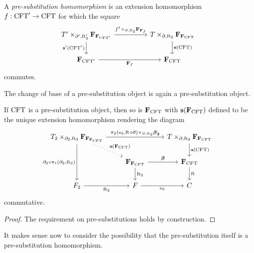 \begin{defn}
A \emph{pre-substitution homomorphism} is an extension homomorphism $f:\mathrm{CFT}'\to \mathrm{CFT}$
for which the square
\begin{equation*}
\begin{tikzcd}[column sep=huge]
\cobesys{\stesyst'}{\famesys{\famesys{\stesys'}}}{\ebd'}{\eft[2]'}
  \ar{r}{\pullback{f^t}{\famehom{\famehom{f}}}{\ebd}{\eft[2]}}
  \ar{d}[swap]{\mathbf{s}'(\stesys')}
  &
\cobesys{\stesyst}{\famesys{\famesys{\stesys}}}{\ebd}{\eft[2]}
  \ar{d}{\mathbf{s}(\stesys)}
  \\
\famesys{\stesys'}
  \ar{r}[swap]{\famehom{f}}
  &
\famesys{\stesys}
\end{tikzcd}
\end{equation*}
commutes.
\end{defn}

\begin{lem}
The change of base of a pre-substitution object is again a pre-substitution object.
\end{lem}

\begin{lem}
If $\mathrm{CFT}$ is a pre-substitution object, then so is $\mathbf{F}_{\mathrm{CFT}}$ with
$\mathbf{s}(\mathbf{F}_{\mathrm{CFT}})$ defined to be the unique extension homomorphism
rendering the diagram
\begin{equation*}
\begin{tikzcd}
\cobesys{\stesyst_2}{\famesys{\famesys{\famesys{\stesys}}}}{\ebd[2]}{\eft[3]}
  \ar[dotted]{dr}{\mathbf{s}(\famesys{\stesys})}
  \ar{rr}{\pullback{\pullbackpr{2}{\ectxext}{\eft\circ\ebd}}{\boldsymbol{\beta}_\mathbf{2}}{\ebd}{\eft[2]}}
  \ar{dd}[swap]{\ebd[2]\circ\pullbackpr{1}{\ebd[2]}{\eft[3]}}
  &
  {}&
\cobesys{\stesyst}{\famesys{\famesys{\stesys}}}{\ebd}{\eft[2]}
  \ar{d}{\mathbf{s}(\stesys)}
  \\
  {}&
\famesys{\famesys{\stesys}}
  \ar{r}{\boldsymbol{\beta}}
  \ar{d}{\eft[2]}
  &
\famesys{\stesys}
  \ar{d}{\eft}
  \\
\stesysf_2
  \ar{r}[swap]{\eft[2]}
  &
\stesysf
  \ar{r}[swap]{\ectxext}
  &
\stesysc
\end{tikzcd}
\end{equation*}
commutative.
\end{lem}

\begin{proof}
The requirement on pre-substitutions holds by construction.
\end{proof}

It makes sense now to consider the possibility that the pre-substitution
itself is a pre-substitution homomorphism.

